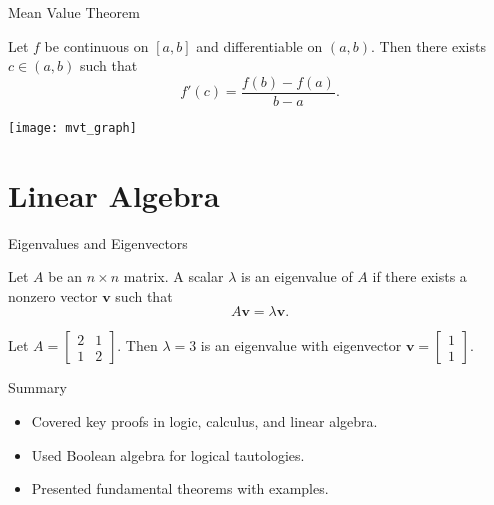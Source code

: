 \documentclass{beamer}
\begin{document}
\begin{frame}{Mean Value Theorem}
    \begin{theorem}
        Let $f$ be continuous on $[a,b]$ and differentiable on $(a,b)$. Then there exists $c \in (a,b)$ such that
        \[
        f'(c) = \frac{f(b) - f(a)}{b - a}.
        \]
    \end{theorem}
    \begin{center}
        \texttt{[image: mvt\_graph]} %
    \end{center}
\end{frame}

\section{Linear Algebra}

\begin{frame}{Eigenvalues and Eigenvectors}
    \begin{definition}
        Let $A$ be an $n \times n$ matrix. A scalar $\lambda$ is an eigenvalue of $A$ if there exists a nonzero vector $\mathbf{v}$ such that
        \[
        A\mathbf{v} = \lambda \mathbf{v}.
        \]
    \end{definition}

    \begin{example}
        Let $A = \begin{bmatrix} 2 & 1 \\ 1 & 2 \end{bmatrix}$. Then $\lambda = 3$ is an eigenvalue with eigenvector $\mathbf{v} = \begin{bmatrix} 1 \\ 1 \end{bmatrix}$.
    \end{example}
\end{frame}

\begin{frame}{Summary}
    \begin{itemize}
        \item Covered key proofs in logic, calculus, and linear algebra.
        \item Used Boolean algebra for logical tautologies.
        \item Presented fundamental theorems with examples.
    \end{itemize}
\end{frame}
\end{document}
